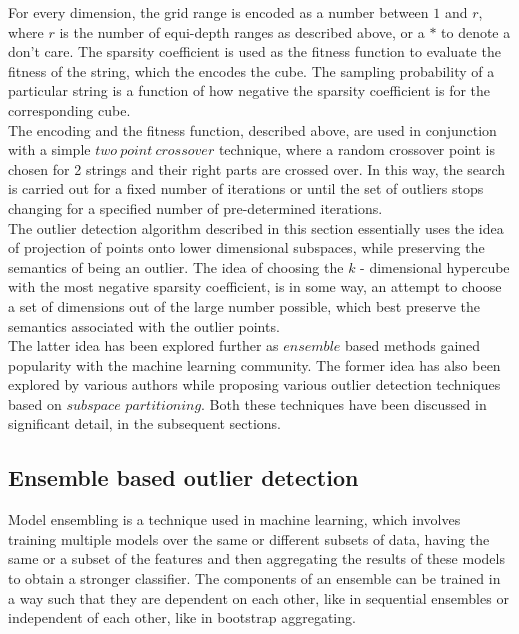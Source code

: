 For every dimension, the grid range is encoded as a number between $1$ and $r$, where $r$ is the number of equi-depth ranges as described above, or a $*$ to denote a don't care. The sparsity coefficient is used as the fitness function to evaluate the fitness of the string, which the encodes the cube. The sampling probability of a particular string is a function of how negative the sparsity coefficient is for the corresponding cube. \\

The encoding and the fitness function, described above, are used in conjunction with a simple $two\ point\ crossover$ technique, where a random crossover point is chosen for 2 strings and their right parts are crossed over. In this way, the search is carried out for a fixed number of iterations or until the set of outliers stops changing for a specified number of pre-determined iterations. \\

The outlier detection algorithm described in this section essentially uses the idea of projection of points onto lower dimensional subspaces, while preserving the semantics of being an outlier. The idea of choosing the $k$ - dimensional hypercube with the most negative sparsity coefficient, is in some way, an attempt to choose a set of dimensions out of the large number possible, which best preserve the semantics associated with the outlier points. \\

The latter idea has been explored further as $ensemble$ based methods gained popularity with the machine learning community. The former idea has also been explored by various authors while proposing various outlier detection techniques based on $subspace$ $partitioning$. Both these techniques have been discussed in significant detail, in the subsequent sections.

\subsection{Ensemble based outlier detection}

Model ensembling is a technique used in machine learning, which involves training multiple models over the same or different subsets of data, having the same or a subset of the features and then aggregating the results of these models to obtain a stronger classifier. The components of an ensemble can be trained in a way such that they are dependent on each other, like in sequential ensembles\cite{RayanaZA16} or independent of each other, like in bootstrap aggregating. \\

